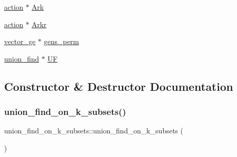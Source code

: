 \begin{DoxyCompactItemize}
\item 
\mbox{\hyperlink{classaction}{action}} $\ast$ \mbox{\hyperlink{classunion__find__on__k__subsets_a9fe66d216cff3c7eaec4224d2f8200a1}{Ark}}
\item 
\mbox{\hyperlink{classaction}{action}} $\ast$ \mbox{\hyperlink{classunion__find__on__k__subsets_a30337fcefa30060c3d744cd7092d7b16}{Arkr}}
\item 
\mbox{\hyperlink{classvector__ge}{vector\+\_\+ge}} $\ast$ \mbox{\hyperlink{classunion__find__on__k__subsets_a825d6f58d4089e1c5c069167be92664e}{gens\+\_\+perm}}
\item 
\mbox{\hyperlink{classunion__find}{union\+\_\+find}} $\ast$ \mbox{\hyperlink{classunion__find__on__k__subsets_a421a75e48a66d5ef546503a6d55110a8}{UF}}
\end{DoxyCompactItemize}


\subsection{Constructor \& Destructor Documentation}
\mbox{\label{classunion__find__on__k__subsets_a17b8d772080d27f13f0b80caefd0e727}} 
\subsubsection{\texorpdfstring{union\+\_\+find\+\_\+on\+\_\+k\+\_\+subsets()}{union\_find\_on\_k\_subsets()}}
{\footnotesize\ttfamily union\+\_\+find\+\_\+on\+\_\+k\+\_\+subsets\+::union\+\_\+find\+\_\+on\+\_\+k\+\_\+subsets (\begin{DoxyParamCaption}{ }\end{DoxyParamCaption})}

\mbox{\label{classunion__find__on__k__subsets_a51899d7dd8c5b989b398fba473188060}} 
